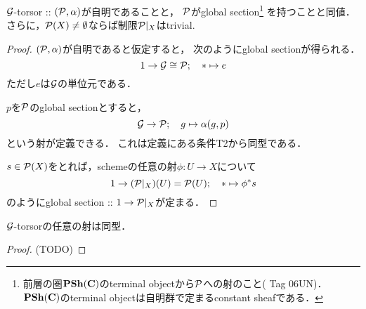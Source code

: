 \documentclass[a4paper, dvipdfmx]{jsarticle}
\begin{document}
\begin{Lemma}
    $\mathcal{G}$-torsor :: $(\mathcal{P}, \alpha)$が自明であることと，
    $\mathcal{P}$がglobal section\footnote
    {
        前層の圏$\mathbf{PSh}(\mathbf{C})$のterminal objectから$\mathcal{P}$への射のこと(\cite{StacksProj} Tag 06UN)．
        $\mathbf{PSh}(\mathbf{C})$のterminal objectは自明群で定まるconstant sheafである．
    }
    を持つことと同値．
    さらに，$\mathcal{P}(X) \neq \emptyset$ならば制限$\mathcal{P}|_{X}$はtrivial.
\end{Lemma}
\begin{proof}
    $(\mathcal{P}, \alpha)$が自明であると仮定すると，
    次のようにglobal sectionが得られる．
    \[ 1 \to \mathcal{G} \cong \mathcal{P}; \quad * \mapsto e \]
    ただし$e$は$\mathcal{G}$の単位元である．

    $p$を$\mathcal{P}$のglobal sectionとすると，
    \[ \mathcal{G} \to \mathcal{P}; \quad g \mapsto \alpha(g, p) \]
    という射が定義できる．
    これは定義にある条件T2から同型である．

    $s \in \mathcal{P}(X)$をとれば，schemeの任意の射$\phi \colon U \to X$について
    \[ 1 \to (\mathcal{P}|_{X})(U)=\mathcal{P}(U);\quad * \mapsto \phi^*s \]
    のようにglobal section :: $1 \to \mathcal{P}|_{X}$が定まる．
\end{proof}

\begin{Cor}
    $\mathcal{G}$-torsorの任意の射は同型．
\end{Cor}
\begin{proof}
    (TODO)
\end{proof}
\end{document}
